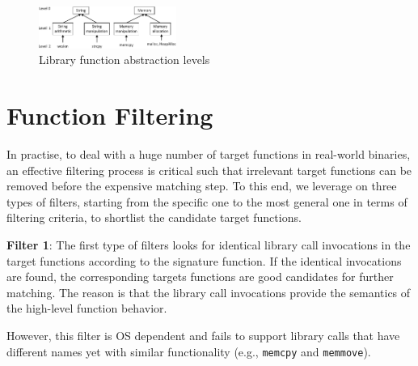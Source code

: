

\begin{figure}[t]
\begin{center}%
\includegraphics[width=0.4\textwidth]{srj-figures/srj-abs-1.pdf}
\caption{Library function abstraction levels}
\label{fig:abs} \vspace{-2mm}
\end{center}
\end{figure}

\section{Function Filtering}\label{sec:prefilter}

In practise, %
to deal with a huge number of target functions in real-world binaries, an effective filtering process is critical such that irrelevant target functions can be removed before the expensive matching step. To this end, we leverage on three types of filters, starting from the specific one to the most general one in terms of filtering criteria, to shortlist the candidate target functions.

\textbf{Filter 1}: The first type of filters %
 looks for identical library call invocations in the target functions according to the signature function. If the identical invocations are found, the corresponding targets functions are good candidates for further matching. The reason is that the library call invocations provide the semantics of the high-level function behavior.

However, this filter is OS dependent and fails to support library calls that have different names yet with similar functionality (e.g., \texttt{memcpy} and \texttt{memmove}).

